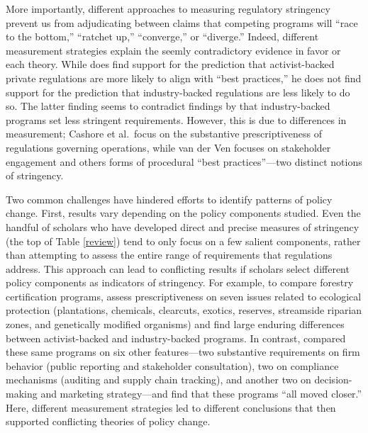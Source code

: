 \documentclass[
      12pt,
            Review ]{article}
\begin{document}
More importantly, different approaches to measuring regulatory stringency prevent us from adjudicating between claims that competing programs will ``race to the bottom,'' ``ratchet up,'' ``converge,'' or ``diverge.'' Indeed, different measurement strategies explain the seemly contradictory evidence in favor or each theory. While \citet{VanderVen2015} does find support for the prediction that activist-backed private regulations are more likely to align with ``best practices,'' he does not find support for the prediction that industry-backed regulations are less likely to do so. The latter finding seems to contradict findings by \citet{Cashore2004} that industry-backed programs set less stringent requirements. However, this is due to differences in measurement; Cashore et al.~focus on the substantive prescriptiveness of regulations governing operations, while van der Ven focuses on stakeholder engagement and others forms of procedural ``best practices''---two distinct notions of stringency.

Two common challenges have hindered efforts to identify patterns of policy change. First, results vary depending on the policy components studied. Even the handful of scholars who have developed direct and precise measures of stringency (the top of Table \ref{review}) tend to only focus on a few salient components, rather than attempting to assess the entire range of requirements that regulations address. This approach can lead to conflicting results if scholars select different policy components as indicators of stringency. For example, to compare forestry certification programs, \citet{Cashore2004} assess prescriptiveness on seven issues related to ecological protection (plantations, chemicals, clearcuts, exotics, reserves, streamside riparian zones, and genetically modified organisms) and find large enduring differences between activist-backed and industry-backed programs. In contrast, \citet{Overdevest2014} compared these same programs on six other features---two substantive requirements on firm behavior (public reporting and stakeholder consultation), two on compliance mechanisms (auditing and supply chain tracking), and another two on decision-making and marketing strategy---and find that these programs ``all moved closer.'' Here, different measurement strategies led to different conclusions that then supported conflicting theories of policy change.
\end{document}
